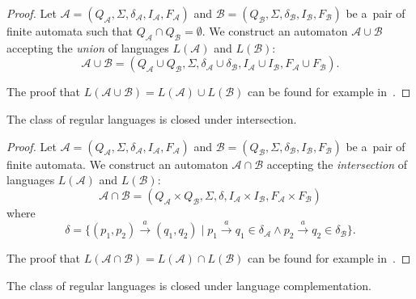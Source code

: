 \begin{proof}
Let $\mathcal{A} = (Q_\mathcal{A}, \Sigma, \delta_\mathcal{A}, I_\mathcal{A},
F_\mathcal{A})$ and $\mathcal{B} = (Q_\mathcal{B}, \Sigma, \delta_\mathcal{B},
I_\mathcal{B}, F_\mathcal{B})$ be a~pair of finite automata such that
$Q_\mathcal{A} \cap Q_\mathcal{B} = \emptyset$. We construct an automaton
$\mathcal{A} \cup \mathcal{B}$ accepting the \emph{union} of languages
$L(\mathcal{A})$ and $L(\mathcal{B})$: 
\begin{equation} \mathcal{A} \cup \mathcal{B} = (Q_\mathcal{A} \cup
 Q_\mathcal{B}, \Sigma, \delta_\mathcal{A} \cup \delta_\mathcal{B},
 I_\mathcal{A} \cup I_\mathcal{B}, F_\mathcal{A} \cup
F_\mathcal{B}).
\end{equation}

\noindent The proof that $L(\mathcal{A} \cup \mathcal{B}) = L(\mathcal{A}) \cup
L(\mathcal{B})$ can be found for example in~\cite{tin}.
\end{proof}

  \begin{theorem}
	 The class of regular languages is closed under intersection.
	\end{theorem}
	
	\begin{proof}
Let $\mathcal{A} = (Q_\mathcal{A}, \Sigma, \delta_\mathcal{A}, I_\mathcal{A},
F_\mathcal{A})$ and $\mathcal{B} = (Q_\mathcal{B}, \Sigma, \delta_\mathcal{B},
I_\mathcal{B}, F_\mathcal{B})$ be a~pair of finite automata. We construct an
automaton $\mathcal{A} \cap \mathcal{B}$ accepting the \emph{intersection} of
languages $L(\mathcal{A})$ and $L(\mathcal{B})$:
\begin{equation}
\mathcal{A} \cap \mathcal{B} = (Q_\mathcal{A} \times
Q_\mathcal{B}, \Sigma, \delta, I_\mathcal{A} \times I_\mathcal{B}, F_\mathcal{A}
\times F_\mathcal{B})
\end{equation} where 
\begin{equation}
\delta = \{(p_1, p_2) \overset{a}{\longrightarrow} (q_1, q_2) \mid p_1
\overset{a}{\longrightarrow} q_1 \in \delta_{\mathcal{A}} \wedge p_2
\overset{a}{\longrightarrow} q_2 \in \delta_{\mathcal{B}}\}.
\end{equation}

\noindent The proof that $L(\mathcal{A} \cap \mathcal{B}) = L(\mathcal{A}) \cap
L(\mathcal{B})$ can be found for example in~\cite{tin}.
\end{proof}
	
 \begin{theorem}
  The class of regular languages is closed under language complementation.
\end{theorem}
	
